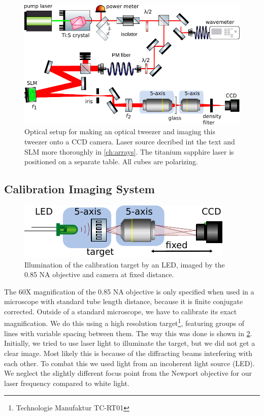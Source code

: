 \begin{figure}
    \centering
    \includegraphics[width=0.8\linewidth]{figures/TiSandSLM.pdf}
    \caption{Optical setup for making an optical tweezer and imaging this tweezer onto a CCD camera. 
    Laser source decribed int the text and \ac{SLM} more thoroughly in \cref{ch:arrays}.
    The titanium sapphire laser is positioned on a separate table. 
    All cubes are polarizing.}
    \label{fig:TiSandSLMsetup}
\end{figure}

\subsection{Calibration Imaging System}

\begin{figure}
    \centering
    \includegraphics[width = 0.5\linewidth]{figures/LEDcalibration.pdf}
    \caption{Illumination of the calibration target by an LED, imaged by the 0.85 NA objective and camera at fixed distance.}
    \label{fig:resolutionTarget}
\end{figure}

The 60X magnification of the 0.85 NA objective is only specified when used in a microscope with standard tube length distance, because it is finite conjugate corrected.
Outside of a standard microscope, we have to calibrate its exact magnification.
We do this using a high resolution target\footnote{Technologie Manufaktur TC-RT01}, featuring groups of lines with variable spacing between them. 
The way this was done is shown in \cref{fig:resolutionTarget}.
Initially, we tried to use laser light to illuminate the target, but we did not get a clear image. 
Most likely this is because of the diffracting beams interfering with each other. 
To combat this we used light from an incoherent light source (\ac{LED}). We neglect the slightly different focus point from the Newport objective for our laser frequency compared to white light. 

